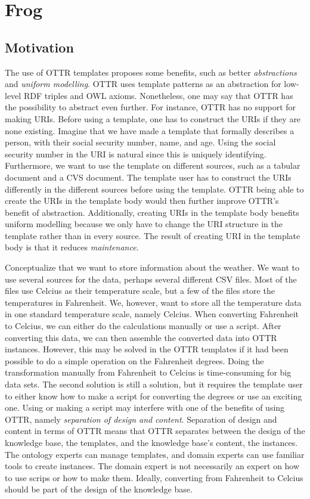 \section{Frog}

\subsection{Motivation}
\label{motivation}
The use of OTTR templates proposes some benefits, such as better \emph{abstractions} and \emph{uniform modelling}. OTTR uses template patterns as an abstraction for low-level RDF triples and OWL axioms. Nonetheless, one may say that OTTR has the possibility to abstract even further. For instance, OTTR has no support for making URIs. Before using a template, one has to construct the URIs if they are none existing. Imagine that we have made a template that formally describes a person, with their social security number, name, and age. Using the social security number in the URI is natural since this is uniquely identifying. Furthermore, we want to use the template on different sources, such as a tabular document and a CVS document. The template user has to construct the URIs differently in the different sources before using the template. OTTR being able to create the URIs in the template body would then further improve OTTR's benefit of abstraction. Additionally, creating URIs in the template body benefits uniform modelling because we only have to change the URI structure in the template rather than in every source. The result of creating URI in the template body is that it reduces \emph{maintenance}.

\para
Conceptualize that we want to store information about the weather. We want to use several sources for the data, perhaps several different CSV files. Most of the files use Celcius as their temperature scale, but a few of the files store the temperatures in Fahrenheit. We, however, want to store all the temperature data in one standard temperature scale, namely Celcius. When converting Fahrenheit to Celcius, we can either do the calculations manually or use a script. After converting this data, we can then assemble the converted data into OTTR instances. However, this may be solved in the OTTR templates if it had been possible to do a simple operation on the Fahrenheit degrees. Doing the transformation manually from Fahrenheit to Celcius is time-consuming for big data sets. The second solution is still a solution, but it requires the template user to either know how to make a script for converting the degrees or use an exciting one. Using or making a script may interfere with one of the benefits of using OTTR, namely \emph{separation of design and content}. Separation of design and content in terms of OTTR means that OTTR separates between the design of the knowledge base, the templates, and the knowledge base's content, the instances. The ontology experts can manage templates, and domain experts can use familiar tools to create instances. The domain expert is not necessarily an expert on how to use scrips or how to make them. Ideally, converting from Fahrenheit to Celcius should be part of the design of the knowledge base.  

